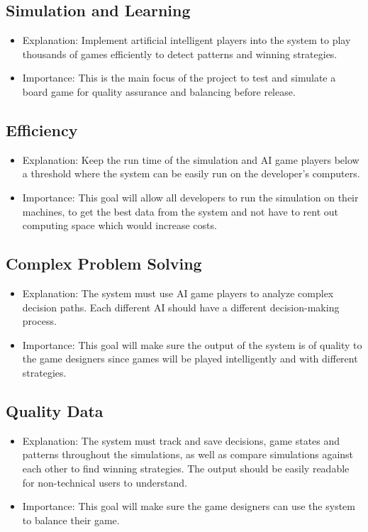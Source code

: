 \documentclass{article}
\begin{document}
\subsection{Simulation and Learning}
\begin{itemize}
\item Explanation: Implement artificial intelligent players into the system to play thousands of games efficiently to detect patterns and winning strategies.
\item Importance: This is the main focus of the project to test and simulate a board game for quality assurance and balancing before release.
\end{itemize}

\subsection{Efficiency}
\begin{itemize}
\item Explanation: Keep the run time of the simulation and AI game players below a threshold where the system can be easily run on the developer's computers.
\item Importance: This goal will allow all developers to run the simulation on their machines, to get the best data from the system and not have to rent out computing space which would increase costs.
\end{itemize}

\subsection{Complex Problem Solving}
\begin{itemize}
\item Explanation: The system must use AI game players to analyze complex decision paths. Each different AI should have a different decision-making process.
\item Importance: This goal will make sure the output of the system is of quality to the game designers since games will be played intelligently and with different strategies.
\end{itemize}

\subsection*{Quality Data}
\begin{itemize}
  \item Explanation: The system must track and save decisions, game states and patterns throughout the simulations, as well as compare simulations against each other to find winning strategies. The output should be easily readable for non-technical users to understand.
  \item Importance: This goal will make sure the game designers can use the system to balance their game.
\end{itemize}
\end{document}
